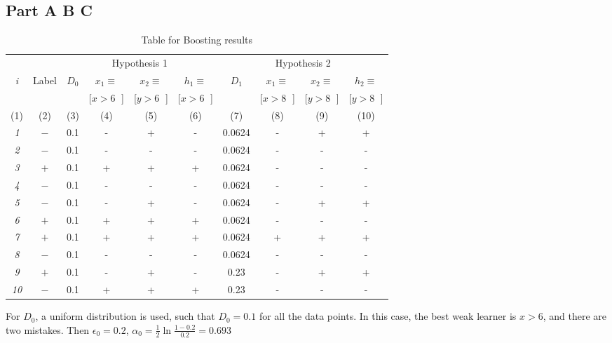 \subsection{Part A B C}
\begin{table}[!t]
	{\centering
		\begin{tabular}{|c|c||c|c|c|c||c|c|c|c|}
			
			\hline
			& & \multicolumn{4}{c||}{Hypothesis 1}
			& \multicolumn{4}{c|}{Hypothesis 2} \\
			\cline{3-10}
			{\em i} & Label & $D_0$ & $x_1 \equiv $ & $x_2 \equiv $ & $h_1\equiv$ & $D_1$ &  $x_1 \equiv $ & $x_2 \equiv $ & $h_2 \equiv $ \\
			&  & & [$x > 6$ $\;$] & [$y > 6$ $ \;$] & [$x > 6$ $\;$] & & [$x >8$ $\;$] & [$y >8$ $\;$] & [$y > 8$ $\;$] \\
			
			\tiny{(1)} & \tiny{(2)} & \tiny{(3)} & \tiny{(4)} &  \tiny{(5)} & \tiny{(6)} & \tiny{(7)} & \tiny{(8)} & \tiny{(9)} & \tiny{(10)}\\
			\hline \hline
			{\em 1} & $-$ & 0.1 & - & + & - & 0.0624 & - & + & + \\
			\hline
			{\em 2} & $-$ & 0.1 & - & - & - & 0.0624 & - & - & - \\
			\hline
			{\em 3} & $+$ & 0.1 & + & + & + & 0.0624 & - & - & - \\
			\hline
			{\em 4} & $-$ & 0.1 & - & - & - & 0.0624 & - & - & - \\
			\hline
			{\em 5} & $-$ & 0.1 & - & + & - & 0.0624 & - & + & + \\
			\hline
			{\em 6} & $+$ & 0.1 & + & + & + & 0.0624 & - & - & - \\
			\hline
			{\em 7} & $+$ & 0.1 & + & + & + & 0.0624 & + & + & + \\
			\hline
			{\em 8} & $-$ & 0.1 & - & - & - & 0.0624 & - & - & - \\
			\hline
			{\em 9} & $+$ & 0.1 & - & + & - & 0.23 & - & + & + \\
			\hline
			{\em 10} & $-$ & 0.1 & + & + & + & 0.23 & - & - & - \\
			\hline
		\end{tabular}
		\caption{Table for Boosting results} \label{table:ltu}}
\end{table}
For $D_0$, a uniform distribution is used, such that $D_0=0.1$ for all the data points. In this case, the best weak learner is $x>6$, and there are two mistakes. Then $\epsilon_{0}=0.2$, $\alpha_{0}=\frac{1}{2}\ln{\frac{1-0.2}{0.2}}=0.693$

